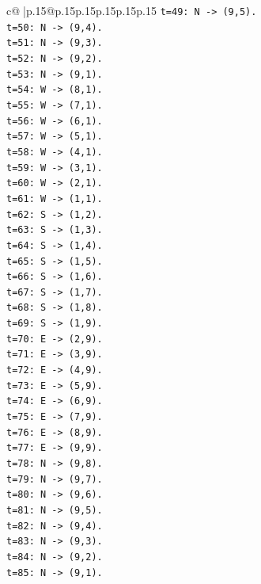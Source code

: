 \documentclass{article}
\begin{document}
{\begin{supertabular}{c@{$\;$}|p{.15\linewidth}@{}p{.15\linewidth}p{.15\linewidth}p{.15\linewidth}p{.15\linewidth}p{.15\linewidth}}
{{{\texttt{t=49: N {-}> (9,5).} \\
\texttt{t=50: N {-}> (9,4).} \\
\texttt{t=51: N {-}> (9,3).} \\
\texttt{t=52: N {-}> (9,2).} \\
\texttt{t=53: N {-}> (9,1).} \\
\texttt{t=54: W {-}> (8,1).} \\
\texttt{t=55: W {-}> (7,1).} \\
\texttt{t=56: W {-}> (6,1).} \\
\texttt{t=57: W {-}> (5,1).} \\
\texttt{t=58: W {-}> (4,1).} \\
\texttt{t=59: W {-}> (3,1).} \\
\texttt{t=60: W {-}> (2,1).} \\
\texttt{t=61: W {-}> (1,1).} \\
\texttt{t=62: S {-}> (1,2).} \\
\texttt{t=63: S {-}> (1,3).} \\
\texttt{t=64: S {-}> (1,4).} \\
\texttt{t=65: S {-}> (1,5).} \\
\texttt{t=66: S {-}> (1,6).} \\
\texttt{t=67: S {-}> (1,7).} \\
\texttt{t=68: S {-}> (1,8).} \\
\texttt{t=69: S {-}> (1,9).} \\
\texttt{t=70: E {-}> (2,9).} \\
\texttt{t=71: E {-}> (3,9).} \\
\texttt{t=72: E {-}> (4,9).} \\
\texttt{t=73: E {-}> (5,9).} \\
\texttt{t=74: E {-}> (6,9).} \\
\texttt{t=75: E {-}> (7,9).} \\
\texttt{t=76: E {-}> (8,9).} \\
\texttt{t=77: E {-}> (9,9).} \\
\texttt{t=78: N {-}> (9,8).} \\
\texttt{t=79: N {-}> (9,7).} \\
\texttt{t=80: N {-}> (9,6).} \\
\texttt{t=81: N {-}> (9,5).} \\
\texttt{t=82: N {-}> (9,4).} \\
\texttt{t=83: N {-}> (9,3).} \\
\texttt{t=84: N {-}> (9,2).} \\
\texttt{t=85: N {-}> (9,1).} \\
}}}
\end{supertabular}}
\end{document}
